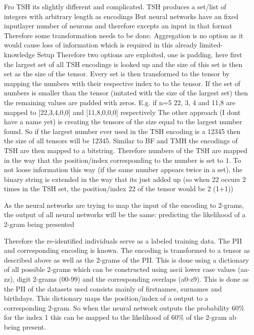 Fro TSH its slightly different and complicated.
TSH produces a set/list of integers with arbitrary length as encodings
But neural networks have an fixed inputlayer number of neurons and therefore excepts an input in that format
Therefore some transformation needs to be done. Aggregation is no option as it would cause loss of information which is required in this already limited-knowledge Setup
Therefore two options are exploited, one is padding. here first the largest set of all TSH encodings is looked up and the size of this set is then set as the size of the tensor. Every set is then transformed to the tensor by mapping the numbers with their respective index to to the tensor. If the set of numbers is smaller than the tensor (initated with the size of the largest set) then the remaining values are padded with zeros. E.g. if n=5 {22, 3, 4} and {11,8} are mapped to [22,3,4,0,0] and [11,8,0,0,0] respectively
The other approach (I dont have a name yet) is creating the tensors of the size equal to the largest number found. So if the largest number ever used in the TSH encoding is a 12345 then the size of all tensors will be 12345. Similar to BF and TMH the encodings of TSH are then mapped to a bitstring. Therefore numbers of the TSH are mapped in the way that the position/index corresponding to the number is set to 1. To not loose information this way (if the same number appears twice in a set), the binary string is extended in the way that its just added up (so when 22 occurs 2 times in the TSH set, the position/index 22 of the tensor would be 2 (1+1))

As the neural networks are trying to map the input of the encoding to 2-grams, the output of all neural networks will be the same: predicting the likelihood of a 2-gram being presented

Therefore the re-identified individuals serve as a labeled training data. The PII and corresponding encoding is known. The encoding is transformed to a tensor as described above as well as the 2-grams of the PII. This is done using a dictionary of all possible 2-grams which can be constructed using ascii lower case values (aa-zz), digit 2-grams (00-99) and the corresponding overlaps (a0-z9). This is done as the PII of the datasets used consists mainly of firstnames, surnames and birthdays. This dictionary maps the position/index of a output to a corresponding 2-gram. So when the neural network outputs the probability 60\% for the index 1 this can be mapped to the likelihood of 60\% of the 2-gram ab being present.


